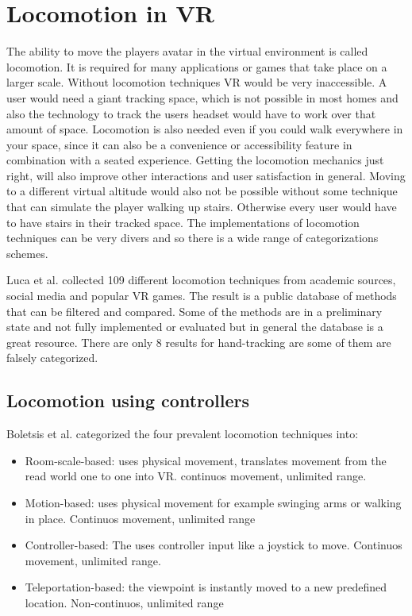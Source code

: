 \section{Locomotion in VR}\label{locomotion-in-vr}
The ability to move the players avatar in the virtual environment is
called locomotion. It is required for many applications or games that
take place on a larger scale. Without locomotion techniques VR would be
very inaccessible. A user would need a giant tracking space, which is
not possible in most homes and also the technology to track the users
headset would have to work over that amount of space. Locomotion is also
needed even if you could walk everywhere in your space, since it can
also be a convenience or accessibility feature in combination with a
seated experience. Getting the locomotion mechanics just right, will
also improve other interactions and user satisfaction in general. Moving
to a different virtual altitude would also not be possible without some
technique that can simulate the player walking up stairs. Otherwise
every user would have to have stairs in their tracked space. The
implementations of locomotion techniques can be very divers and so there
is a wide range of categorizations schemes.

Luca et al. \cite{Luca} collected 109 different locomotion techniques from academic
sources, social media and popular VR games. The result is a public
database of methods that can be filtered and compared. Some of the
methods are in a preliminary state and not fully implemented or
evaluated but in general the database is a great resource. There are only 8 results for hand-tracking
are some of them are falsely categorized.

\subsection{Locomotion using controllers}\label{locomotion-using-controllers}

Boletsis et al. \cite{Boletsis} categorized the four
prevalent locomotion techniques into:

\begin{itemize}
\itemsep1pt\parskip0pt
\item
  Room-scale-based: uses physical movement, translates movement from the
  read world one to one into VR. continuos movement, unlimited range.\\
\item
  Motion-based: uses physical movement for example swinging arms or
  walking in place. Continuos movement, unlimited range\\
\item
  Controller-based: The uses controller input like a joystick to move.
  Continuos movement, unlimited range.\\
\item
  Teleportation-based: the viewpoint is instantly moved to a new
  predefined location. Non-continuos, unlimited range
\end{itemize}


